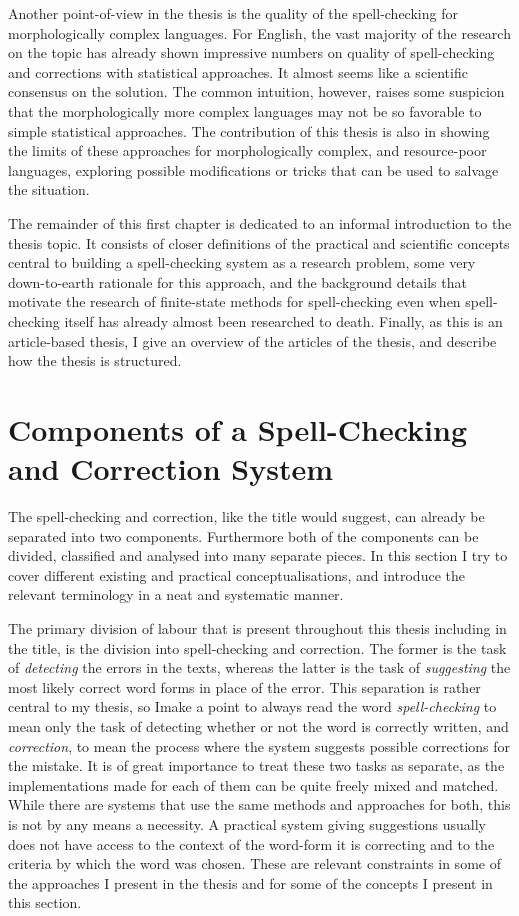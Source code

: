 \documentclass[officiallayout]{unihelcompling}
\begin{document}
Another point-of-view in the thesis is the quality of the spell-checking for
morphologically complex languages. For English, the vast majority of the
research on the topic has already shown impressive numbers on quality of
spell-checking and corrections with statistical approaches. It almost seems
like a scientific consensus on the solution. The common intuition,
however, raises some suspicion that the morphologically more complex languages
may not be so favorable to simple statistical approaches. The contribution of
this thesis is also in showing the limits of these approaches for
morphologically complex, and resource-poor languages, exploring possible
modifications or tricks that can be used to salvage the situation.

The remainder of this first chapter is dedicated to an informal introduction to
the thesis topic. It consists of closer definitions of the practical and
scientific concepts central to building a spell-checking system as a research
problem, some very down-to-earth rationale for this approach, and the
background details that motivate the research of finite-state methods for
spell-checking even when spell-checking itself has already almost been
researched to death. Finally, as this is an article-based thesis, I give an
overview of the articles of the thesis, and describe how the thesis is
structured.

\section{Components of a Spell-Checking and Correction System}
\label{sec:practical-components}

The spell-checking and correction, like the title would suggest, can already be
separated into two components. Furthermore both of the components can be
divided, classified and analysed into many separate pieces. In this section I
try to cover different existing and practical conceptualisations, and introduce
the relevant terminology in a neat and systematic manner.

The primary division of labour that is present throughout this thesis including
in the title, is the division into spell-checking and correction. The former is
the task of \emph{detecting} the errors in the texts, whereas the latter is the
task of \emph{suggesting} the most likely correct word forms in place of the
error. This separation is rather central to my thesis, so Imake a point to
always read the word \emph{spell-checking} to mean only the task of detecting
whether or not the word is correctly written, and \emph{correction}, to mean
the process where the system suggests possible corrections for the mistake.  It
is of great importance to treat these two tasks as separate, as the
implementations made for each of them can be quite freely mixed and matched.
While there are systems that use the same methods and approaches for both, this
is not by any means a necessity. A practical system giving suggestions usually
does not have access to the context of the word-form it is correcting and to
the criteria by which the word was chosen. These are relevant constraints in
some of the approaches I present in the thesis and for some of the concepts I
present in this section.
\end{document}
